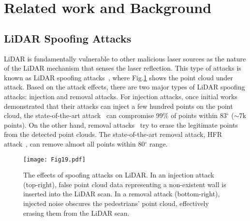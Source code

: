 \section{Related work and Background}
\subsection{LiDAR Spoofing Attacks} \label{sec:lidar_spoofing}
LiDAR is fundamentally vulnerable to other malicious laser sources as the nature of the LiDAR mechanism that senses the laser reflection. This type of attacks is known as LiDAR spoofing attacks~\cite{shin2017illusion, petit2015remote, cao2019adversarial}, where Fig.\ref{example_spoofing} shows the point cloud under attack. Based on the attack effects, there are two major types of LiDAR spoofing attacks: injection and removal attacks. For injection attacks, once initial works~\cite{shin2017illusion, cao2019adversarial} demonstrated that their attacks can inject a few hundred points on the point cloud, the state-of-the-art attack~\cite{sato2024lidar} can compromise 99\% of points within 83$^\circ$ ($\sim$7k points). 
On the other hand, removal attacks~\cite{shin2017illusion, cao2023you,sato2024lidar} try to erase the legitimate points from the detected point clouds. The state-of-the-art removal attack, HFR attack~\cite{sato2024lidar}, can remove almost all points within 80$^\circ$ range. 

\begin{figure}[tb]
  \centering
  \texttt{[image: Fig19.pdf]}
  \caption{The effects of spoofing attacks on LiDAR. In an injection attack (top-right), false point cloud data representing a non-existent wall is inserted into the LiDAR scan. In a removal attack (bottom-right), injected noise obscures the pedestrians' point cloud, effectively erasing them from the LiDAR scan.}
  \label{example_spoofing}
\end{figure}



